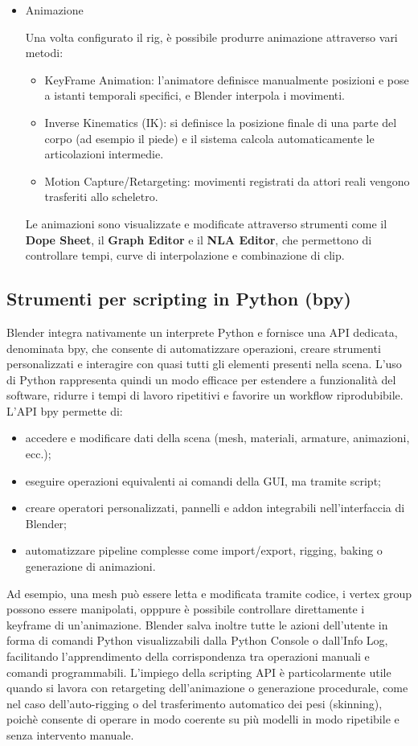 \begin{itemize}
        \item Animazione 

        Una volta configurato il rig, è possibile produrre animazione attraverso vari metodi: 
        \begin{itemize}
            \item  KeyFrame Animation: l'animatore definisce manualmente posizioni e pose a istanti temporali specifici, e Blender interpola i movimenti.
            \item Inverse Kinematics (IK): si definisce la posizione finale di una parte del corpo (ad esempio il piede) e il sistema calcola automaticamente le articolazioni intermedie.
            \item Motion Capture/Retargeting: movimenti registrati da attori reali vengono trasferiti allo scheletro.
        \end{itemize}
        Le animazioni sono visualizzate e modificate attraverso strumenti come il \textbf{Dope Sheet}, il \textbf{Graph Editor} e il \textbf{NLA Editor}, che permettono di controllare tempi, curve di interpolazione e combinazione di clip.
    \end{itemize}

\subsection{Strumenti per scripting in Python (bpy)}
Blender integra nativamente un interprete Python e fornisce una API dedicata, denominata bpy, che consente di automatizzare operazioni, creare strumenti personalizzati e interagire con quasi tutti gli elementi presenti nella scena. L'uso di Python rappresenta quindi un modo efficace per estendere a funzionalità del software, ridurre i tempi di lavoro ripetitivi e favorire un workflow riprodubibile.
L'API bpy permette di:
\begin{itemize}
    \item accedere e modificare dati della scena (mesh, materiali, armature, animazioni, ecc.);
    \item eseguire operazioni equivalenti ai comandi della GUI, ma tramite script;
    \item creare operatori personalizzati, pannelli e addon integrabili nell'interfaccia di Blender;
    \item automatizzare pipeline complesse come import/export, rigging, baking o generazione di animazioni.
\end{itemize}
Ad esempio, una mesh può essere letta e modificata tramite codice, i vertex group possono essere manipolati, opppure è possibile controllare direttamente i keyframe di un'animazione. Blender salva inoltre tutte le azioni dell'utente in forma di comandi Python visualizzabili dalla Python Console o dall'Info Log, facilitando l'apprendimento della corrispondenza tra operazioni manuali e comandi programmabili.
L'impiego della scripting API è particolarmente utile quando si lavora con retargeting dell'animazione o generazione procedurale, come nel caso dell'auto-rigging o del trasferimento automatico dei pesi (skinning), poichè consente di operare in modo coerente su più modelli in modo ripetibile e senza intervento manuale.


